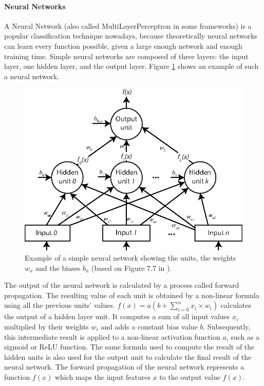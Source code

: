 \paragraph{Neural Networks}

A Neural Network (also called MultiLayerPerceptron in some frameworks) is a popular classification technique nowadays, because theoretically neural networks can learn every function possible, given a large enough network and enough training time. Simple neural networks are composed of three layers: the input layer, one hidden layer, and the output layer. Figure \ref{fig:neural_network} shows an example of such a neural network. 

\begin{figure}
	\centering
	\includegraphics{img/neural_network.eps}

	\caption{Example of a simple neural network showing the units, the weights $w_x$ and the biases $b_x$ (based on Figure 7.7 in \cite{Hall2016_DataMining_ML}).}
	\label{fig:neural_network}
\end{figure}

The output of the neural network is calculated by a process called forward propagation. The resulting value of each unit is obtained by a non-linear formula using all the previous units' values. $f(x) = a(b + \sum_{i=0}^{n} x_i \times w_{i})$ calculates the output of a hidden layer unit. It computes a sum of all input values $x_i$ multiplied by their weights $w_i$ and adds a constant bias value $b$. Subsequently, this intermediate result is applied to a non-linear activation function $a$, such as a sigmoid or ReLU function. The same formula used to compute the result of the hidden units is also used for the output unit to calculate the final result of the neural network. The forward propagation of the neural network represents a function $f(x)$ which maps the input features $x$ to the output value $f(x)$.

